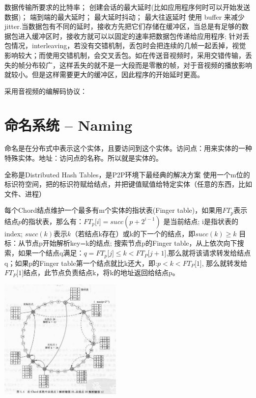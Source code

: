 \documentclass[twoside]{ctexart}
\begin{document}
\begin{multicols}{2}
    数据传输所要求的比特率； 创建会话的最大延时(比如应用程序何时可以开始发送数据)； 端到端的最大延时； 最大延时抖动； 最大往返延时 使用 buffer 来减少 jitter.当数据包有不同的延时，接收方先把它们存储在缓冲区，当总是有足够的数据包进入缓冲区时，接收方就可以以固定的速率把数据包传递给应用程序; 针对丢包情况，interleaving，若没有交错机制，丢包时会把连续的几帧一起丢掉，视觉影响较大；而使用交错机制，会交叉丢包。如在传送音视频时，采用交错传输，丢失的帧分布较广，这样丢失的就不是一大段而是零散的帧，对于音视频的播放影响就较小。但是这样需要更大的缓冲区，因此程序的开始延时更高。

    采用音视频的编解码协议：

  \section{命名系统 -- Naming} 命名是在分布式中表示这个实体，且要访问到这个实体。访问点：用来实体的一种特殊实体。地址：访问点的名称。所以就是实体的。

   全称是Distributed Hash Tables，是P2P环境下最经典的解决方案  使用一个m位的标识符空间，把的标识符赋给结点，并把键值赋值给特定实体（任意的东西，比如文件、进程）

  每个Chord结点维护一个最多有m个实体的指状表(Finger table)，如果用\(FT_{p}\)表示结点\(p\)的指状表，那么有：\(FT_{p}\lbrack i\rbrack = succ\left( p + 2^{i - 1} \right)\) 是当前结点; i是指状表的index; \(succ(k)\)表示\(k\)（若结点k存在）或k的下一个的结点，即\(succ(k) \geq k\) 目标：从节点p开始解析key=k的结点; 搜索节点p的Finger table，从上依次向下搜索，如果一个结点q满足：\(q = FT_{p}\lbrack j\rbrack \leq k < FT_{P}\lbrack j + 1\rbrack\),那么就将该请求转发给结点q；如果p的Finger table第一个结点就比k还大，即:\(p < k < FT_{P}\lbrack 1\rbrack\), 那么就转发给\(FT_{P}\lbrack 1\rbrack\)结点，此节点负责结点k，将k的地址返回给结点p。

\includegraphics[width=0.45\textwidth,keepaspectratio]{pics/DHT.png}
  

\end{multicols}
\end{document}

